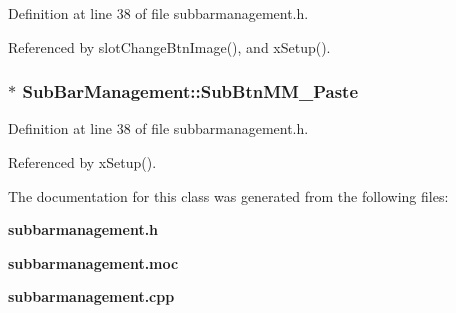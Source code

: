 Definition at line 38 of file subbarmanagement.h.

Referenced by slot\-Change\-Btn\-Image(), and x\-Setup().
\subsubsection{ $\ast$ {\bf Sub\-Bar\-Management::Sub\-Btn\-MM\_\-Paste}}\label{classSubBarManagement_SubBarManagemento1}




Definition at line 38 of file subbarmanagement.h.

Referenced by x\-Setup().

The documentation for this class was generated from the following files:\begin{CompactItemize}
\item 
{\bf subbarmanagement.h}\item 
{\bf subbarmanagement.moc}\item 
{\bf subbarmanagement.cpp}\end{CompactItemize}

